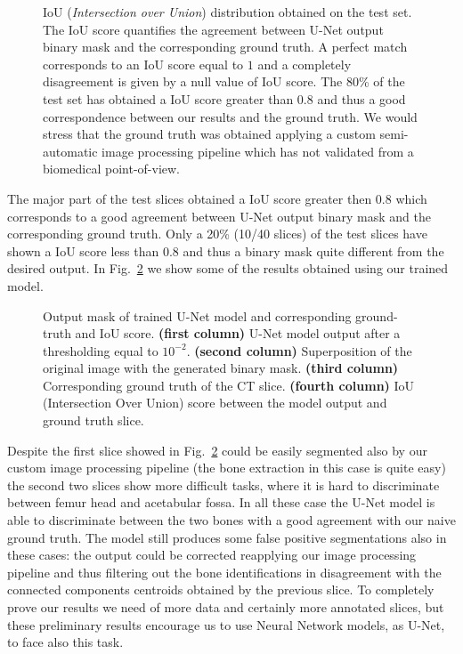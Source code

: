 \documentclass{standalone}
\begin{document}
\begin{figure}[htbp]
\centering
\def\svgwidth{0.85\textwidth}

\caption{IoU (\emph{Intersection over Union}) distribution obtained on the test set.
The IoU score quantifies the agreement between U-Net output binary mask and the corresponding ground truth.
A perfect match corresponds to an IoU score equal to $1$ and a completely disagreement is given by a null value of IoU score.
The 80\% of the test set has obtained a IoU score greater than $0.8$ and thus a good correspondence between our results and the ground truth.
We would stress that the ground truth was obtained applying a custom semi-automatic image processing pipeline which has not validated from a biomedical point-of-view.
}
\label{fig:seg_iou}
\end{figure}

The major part of the test slices obtained a IoU score greater then $0.8$ which corresponds to a good agreement between U-Net output binary mask and the corresponding ground truth.
Only a 20\% (10/40 slices) of the test slices have shown a IoU score less than $0.8$ and thus a binary mask quite different from the desired output.
In Fig.~\ref{fig:seg_res} we show some of the  results obtained using our trained model.

\begin{figure}[htbp]
\centering
\def\svgwidth{\textwidth}

\caption{Output mask of trained U-Net model and corresponding ground-truth and IoU score.
\textbf{(first column)} U-Net model output after a thresholding equal to $10^{-2}$.
\textbf{(second column)} Superposition of the original image with the generated binary mask.
\textbf{(third column)} Corresponding ground truth of the CT slice.
\textbf{(fourth column)} IoU (Intersection Over Union) score between the model output and ground truth slice.
}
\label{fig:seg_res}
\end{figure}

Despite the first slice showed in Fig.~\ref{fig:seg_res} could be easily segmented also by our custom image processing pipeline (the bone extraction in this case is quite easy) the second two slices show more difficult tasks, where it is hard to discriminate between femur head and acetabular fossa.
In all these case the U-Net model is able to discriminate between the two bones with a good agreement with our naive ground truth.
The model still produces some false positive segmentations also in these cases: the output could be corrected reapplying our image processing pipeline and thus filtering out the bone identifications in disagreement with the connected components centroids obtained by the previous slice.
To completely prove our results we need of more data and certainly more annotated slices, but these preliminary results encourage us to use Neural Network models, as U-Net, to face also this task.
\end{document}
